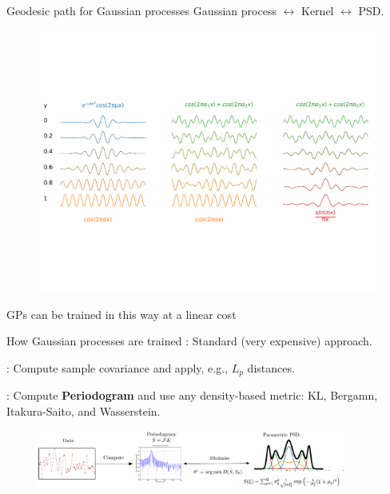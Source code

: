 \documentclass[pdf,aspectratio=169,10pt]{beamer}
\begin{document}
\begin{frame}{Geodesic path for Gaussian processes}
Gaussian process $\leftrightarrow$ Kernel $\leftrightarrow$ PSD.
\begin{figure}
\includegraphics[trim={0 150 0 150},clip,width=1\textwidth]{../img/sinc_gaus_sin2.pdf}
\end{figure}
\centering
{} GPs can be trained in this way at a linear cost
\end{frame}

\begin{frame}[plain]{How Gaussian processes are trained}
    \noindent{}: Standard (very expensive) approach.\vspace{2em}


    \noindent{}: Compute sample covariance and apply, e.g., $L_p$ distances.


    \begin{figure} 
            \centering
        \end{figure}

     \noindent{}: Compute \textbf{Periodogram} and use any density-based metric: KL, Bergamn, Itakura-Saito, and Wasserstein. 
    
        \begin{figure} 
            \centering
            \includegraphics[width=0.9\textwidth]{../img/spectral_metric_diag.pdf}
        \end{figure}


\end{frame}
\end{document}
